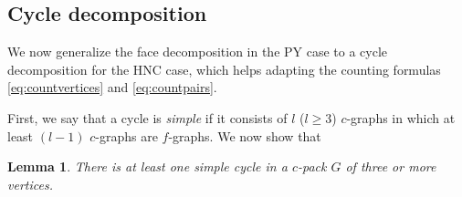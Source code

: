 \documentclass[aip,jcp,reprint,superscriptaddress]{revtex4-1}
\newtheorem{lemm}[thrm]{Lemma}
\begin{document}
\subsection*{Cycle decomposition}



We now generalize the face decomposition in the PY case
  to a cycle decomposition for the HNC case,
  which helps adapting the counting formulas
  \eqref{eq:countvertices} and \eqref{eq:countpairs}.


First, we say that a cycle is \emph{simple}
  if it consists of $l$ ($l \ge 3$) $c$-graphs
  in which at least $(l-1)$ $c$-graphs are $f$-graphs.
%
We now show that
%
%
%
\begin{lemm}
There is at least one simple cycle
  in a $c$-pack $G$ of three or more vertices.
\end{lemm}
%
%
%
\end{document}
